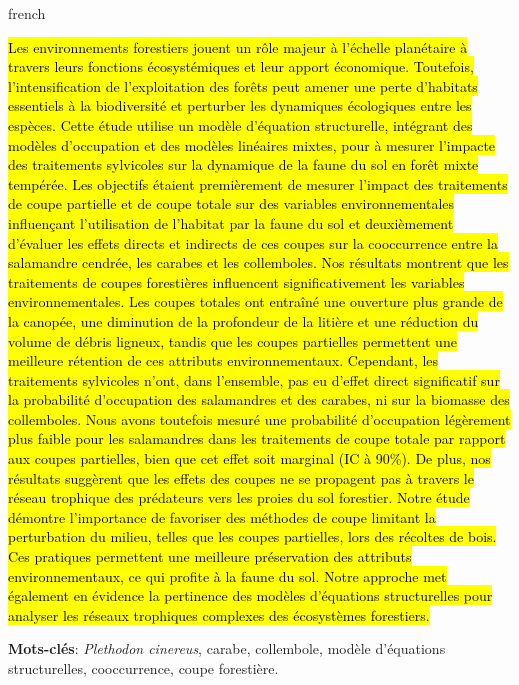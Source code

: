 \begin{otherlanguage*}{french}

\hl{Les environnements forestiers jouent un rôle majeur à l’échelle planétaire à travers leurs fonctions écosystémiques et leur apport économique. 
Toutefois, l'intensification de l'exploitation des forêts peut amener une perte d'habitats essentiels à la biodiversité et perturber les dynamiques écologiques entre les espèces. 
Cette étude utilise un modèle d'équation structurelle, intégrant des modèles d’occupation et des modèles linéaires mixtes, pour à mesurer l'impacte des traitements sylvicoles sur la dynamique de la faune du sol en forêt mixte tempérée. 
Les objectifs étaient premièrement de mesurer l’impact des traitements de coupe partielle et de coupe totale sur des variables environnementales influençant l’utilisation de l’habitat par la faune du sol 
et deuxièmement d’évaluer les effets directs et indirects de ces coupes sur la cooccurrence entre la salamandre cendrée, les carabes et les collemboles. 
Nos résultats montrent que les traitements de coupes forestières influencent significativement les variables environnementales. 
Les coupes totales ont entraîné une ouverture plus grande de la canopée, une diminution de la profondeur de la litière et une réduction du volume de débris ligneux, 
tandis que les coupes partielles permettent une meilleure rétention de ces attributs environnementaux. 
Cependant, les traitements sylvicoles n’ont, dans l’ensemble, pas eu d’effet direct significatif sur la probabilité d’occupation des salamandres et des carabes, ni sur la biomasse des collemboles. 
Nous avons toutefois mesuré une probabilité d’occupation légèrement plus faible pour les salamandres dans les traitements de coupe totale par rapport aux coupes partielles, bien que cet effet soit marginal (IC à 90\%). 
De plus, nos résultats suggèrent que les effets des coupes ne se propagent pas à travers le réseau trophique des prédateurs vers les proies du sol forestier. 
Notre étude démontre l'importance de favoriser des méthodes de coupe limitant la perturbation du milieu, telles que les coupes partielles, lors des récoltes de bois. 
Ces pratiques permettent une meilleure préservation des attributs environnementaux, ce qui profite à la faune du sol. 
Notre approche met également en évidence la pertinence des modèles d’équations structurelles pour analyser les réseaux trophiques complexes des écosystèmes forestiers. }

\textbf{Mots-clés}: \textit{Plethodon cinereus}, carabe, collembole, modèle d'équations structurelles, cooccurrence, coupe forestière.
\end{otherlanguage*}

